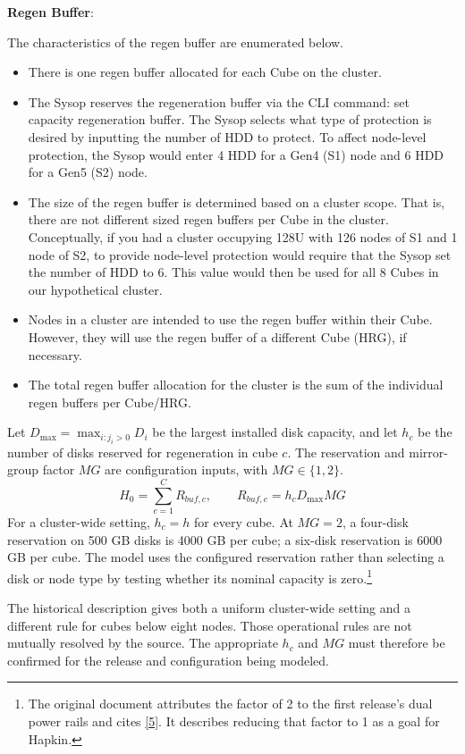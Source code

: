 \textbf{Regen Buffer}:

The characteristics of the regen buffer are enumerated below.

\begin{itemize}
\tightlist
\item
  There is one regen buffer allocated for each Cube on the cluster.
\item
  The Sysop reserves the regeneration buffer via the CLI command: set capacity regeneration buffer. The Sysop selects what type of protection is desired by inputting the number of HDD to protect. To affect node-level protection, the Sysop would enter 4 HDD for a Gen4 (S1) node and 6 HDD for a Gen5 (S2) node.
\item
  The size of the regen buffer is determined based on a cluster scope. That is, there are not different sized regen buffers per Cube in the cluster. Conceptually, if you had a cluster occupying 128U with 126 nodes of S1 and 1 node of S2, to provide node-level protection would require that the Sysop set the number of HDD to 6. This value would then be used for all 8 Cubes in our hypothetical cluster.
\item
  Nodes in a cluster are intended to use the regen buffer within their Cube. However, they will use the regen buffer of a different Cube (HRG), if necessary.
\item
  The total regen buffer allocation for the cluster is the sum of the individual regen buffers per Cube/HRG.
\end{itemize}

Let \(D_{\max}=\max_{i:j_i>0}D_i\) be the largest installed disk
capacity, and let \(h_c\) be the number of disks reserved for regeneration in
cube \(c\). The reservation and mirror-group factor \(MG\) are configuration
inputs, with \(MG\in\{1,2\}\).
\begin{equation}\label{eq:8}
H_0=\sum_{c=1}^{C}R_{buf,c},\qquad R_{buf,c}=h_cD_{\max}MG
\end{equation}
For a cluster-wide setting, \(h_c=h\) for every cube. At \(MG=2\),
a four-disk reservation on 500 GB disks is 4000 GB per cube; a six-disk
reservation is 6000 GB per cube. The model uses the configured reservation
rather than selecting a disk or node type by testing whether its nominal
capacity is zero.\footnote{The original document attributes the factor of
2 to the first release's dual power rails and cites \hyperref[ref:5]{[5]}.
It describes reducing that factor to 1 as a goal for Hapkin.}

The historical description gives both a uniform cluster-wide setting and
a different rule for cubes below eight nodes. Those operational rules are
not mutually resolved by the source. The appropriate \(h_c\) and \(MG\)
must therefore be confirmed for the release and configuration being modeled.

